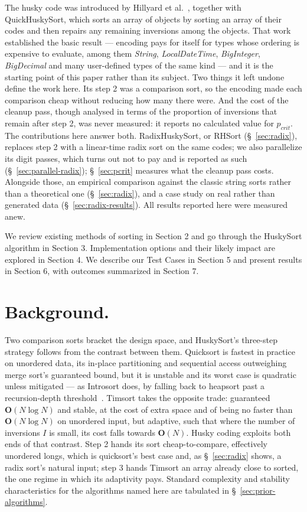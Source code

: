 \documentclass[twoside,leqno,twocolumn]{article}
\begin{document}
The husky code was introduced by Hillyard et al.~\cite{huskysort2020}, together with QuickHuskySort,
which sorts an array of objects by sorting an array of their codes and then repairs any remaining inversions among the objects.
That work established the basic result --- encoding pays for itself for types whose ordering is expensive
to evaluate, among them \emph{String}, \emph{LocalDateTime}, \emph{BigInteger}, \emph{BigDecimal} and many
user-defined types of the same kind --- and it is the starting point of this paper rather than its
subject.
Two things it left undone define the work here.
Its step 2 was a comparison sort, so the encoding made each comparison cheap without reducing how
many there were.
And the cost of the cleanup pass, though analysed in terms of the proportion of inversions that remain after step 2,
was never measured: it reports no calculated value for $p_{crit}$.
The contributions here answer both.
RadixHuskySort, or RHSort (\S~\ref{sec:radix}), replaces step 2 with a linear-time radix sort on the
same codes; we also parallelize its digit passes, which turns out not to pay and is reported as
such (\S~\ref{sec:parallel-radix});
\S~\ref{sec:pcrit} measures what the cleanup pass costs.
Alongside those, an empirical comparison against the classic string sorts rather than a theoretical
one (\S~\ref{sec:radix}), and a case study on real rather than generated data
(\S~\ref{sec:radix-results}).
All results reported here were measured anew.

We review existing methods of sorting in Section 2 and go through the HuskySort algorithm in Section 3.
Implementation options and their likely impact are explored in Section 4.
We describe our Test Cases in Section 5 and present results in Section 6, with outcomes summarized in Section 7.


\section{Background.}
\label{sec:background}

Two comparison sorts bracket the design space, and HuskySort's three-step strategy follows from the
contrast between them.
Quicksort is fastest in practice on unordered data, its in-place partitioning and sequential access
outweighing merge sort's guaranteed bound, but it is unstable and its worst case is quadratic unless
mitigated --- as Introsort does, by falling back to heapsort past a recursion-depth
threshold~\cite{doi:10.1002}.
Timsort takes the opposite trade: guaranteed $\textbf{O}(N \log N)$ and stable, at the cost of extra
space and of being no faster than $\textbf{O}(N \log N)$ on unordered input, but adaptive, such that where the
number of inversions $I$ is small, its cost falls towards $\textbf{O}(N)$.
Husky coding exploits both ends of that contrast.
Step 2 hands its sort cheap-to-compare, effectively unordered longs, which is quicksort's best case and,
as \S~\ref{sec:radix} shows, a radix sort's natural input; step 3 hands Timsort an array already close to
sorted, the one regime in which its adaptivity pays.
Standard complexity and stability characteristics for the algorithms named here are tabulated in
\S~\ref{sec:prior-algorithms}.
\end{document}
